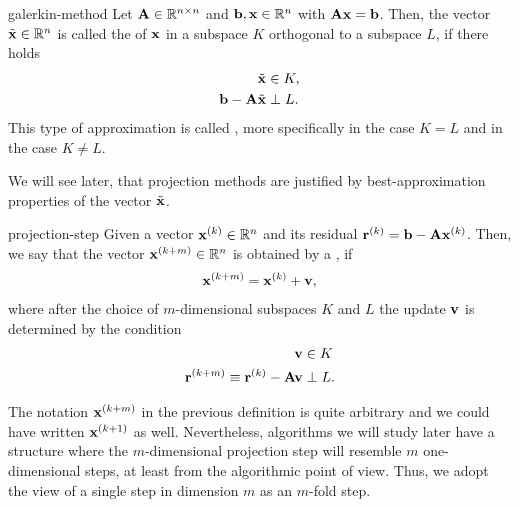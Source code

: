 \begin{Definition}{galerkin-method}
  Let $\mathbf A\in\mathbb R^{n\times n}$ and $\mathbf b, \mathbf x\in\mathbb R^n$ with $\mathbf A\mathbf x=\mathbf b$. Then,
  the vector $\tilde{\mathbf x}\in\mathbb R^n$ is called the  of $\mathbf x$ in a subspace $K$ orthogonal to a subspace
  $L$, if there holds
  \begin{align}
    \tilde{\mathbf x} &\in K,\\
    \mathbf b-\mathbf A\tilde{\mathbf x} &\perp L.
                         \label{eq:krylov:1}
  \end{align}
  This type of approximation is called , more
  specifically  in the case $K=L$ and
   in the case $K\neq L$.
\end{Definition}

\begin{remark}
  We will see later, that projection methods are justified by
  best-approximation properties of the vector $\tilde {\mathbf x}$.
\end{remark}

\begin{Definition}{projection-step}
  Given a vector $\mathbf x^{(k)}\in\mathbb R^n$ and its residual
  $\mathbf r^{(k)}=\mathbf b-\mathbf A\mathbf x^{(k)}$. Then, we say that the vector
  $\mathbf x^{(k+m)}\in\mathbb R^n$ is obtained by a , if
  \begin{gather}
    \mathbf x^{(k+m)} = \mathbf x^{(k)} + \mathbf v,
  \end{gather}
  where after the choice of $m$-dimensional subspaces $K$ and $L$ the update $\mathbf v$ is
  determined by the condition
  \begin{align}
    \mathbf v &\in K\\
    \mathbf r^{(k+m)} \equiv \mathbf r^{(k)} - \mathbf A\mathbf v &\perp L.
  \end{align}
\end{Definition}

\begin{remark}
  The notation $\mathbf x^{(k+m)}$ in the previous definition is quite
  arbitrary and we could have written $\mathbf x^{(k+1)}$ as
  well. Nevertheless, algorithms we will study later have a structure
  where the $m$-dimensional projection step will resemble $m$
  one-dimensional steps, at least from the algorithmic point of
  view. Thus, we adopt the view of a single step in dimension $m$ as
  an $m$-fold step.
\end{remark}

